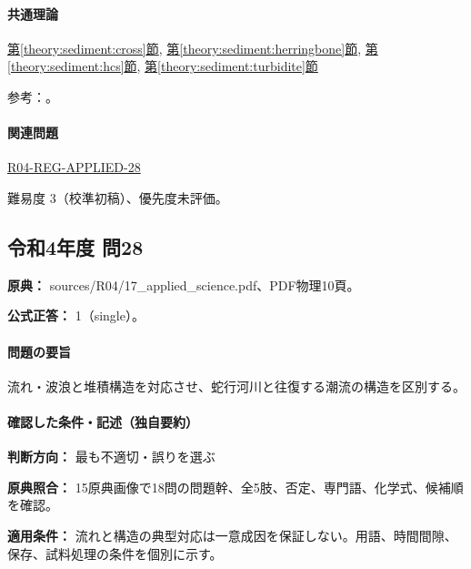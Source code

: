 \paragraph{共通理論} \hyperref[theory:sediment:cross]{第\ref*{theory:sediment:cross}節}, \hyperref[theory:sediment:herringbone]{第\ref*{theory:sediment:herringbone}節}, \hyperref[theory:sediment:hcs]{第\ref*{theory:sediment:hcs}節}, \hyperref[theory:sediment:turbidite]{第\ref*{theory:sediment:turbidite}節}

\par 参考：\cite{sed_mit_environment,sed_mit_cross,sed_houston_structures}。

\paragraph{関連問題} \hyperref[q:r04-reg-applied-28]{R04-REG-APPLIED-28}

\par 難易度 3（校準初稿）、優先度未評価。

\subsection{令和4年度 問28}
\label{q:r04-reg-applied-28}

\noindent\textbf{原典：} sources/R04/17\_applied\_science.pdf、PDF物理10頁。

\textbf{公式正答：} 1（single）。

\paragraph{問題の要旨} 流れ・波浪と堆積構造を対応させ、蛇行河川と往復する潮流の構造を区別する。

\paragraph{確認した条件・記述（独自要約）}\mbox{}\par

\noindent\textbf{判断方向：} 最も不適切・誤りを選ぶ\par

\noindent\textbf{原典照合：} 15原典画像で18問の問題幹、全5肢、否定、専門語、化学式、候補順を確認。\par

\noindent\textbf{適用条件：} 流れと構造の典型対応は一意成因を保証しない。用語、時間間隙、保存、試料処理の条件を個別に示す。\par

